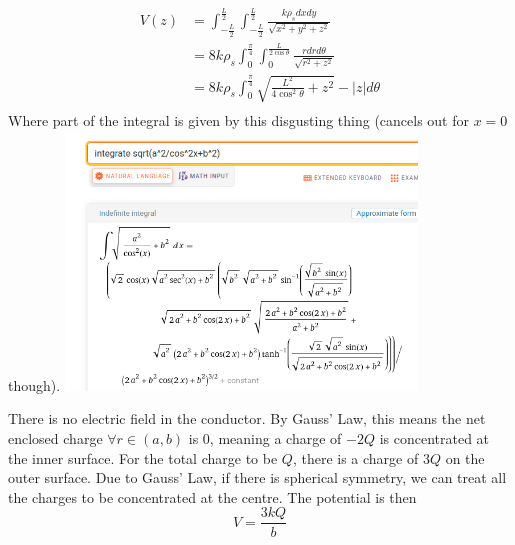 \documentclass[answers]{exam}
\begin{document}
\begin{questions}

\begin{solution}
	\begin{align*}
		V(z) &= \int_{-\frac{L}{2}}^{\frac{L}{2}} \int_{-\frac{L}{2}}^{\frac{L}{2}} \frac{k\rho_s dxdy}{\sqrt{x^2+y^2+z^2}} \\
		     &= 8k\rho_s \int_0^{\frac{\pi}{4}} \int_0^{\frac{L}{2\cos\theta}} \frac{rdrd\theta}{\sqrt{r^2+z^2}} \\
		     &= 8k\rho_s \int_0^{\frac{\pi}{4}} \sqrt{\frac{L^2}{4\cos^2\theta} + z^2} - |z| d\theta \\
	\end{align*}
	Where part of the integral is given by this disgusting thing (cancels out for $x=0$ though).
	\includegraphics[width=0.7\textwidth]{sol.png}
\end{solution}


\begin{solution}
	There is no electric field in the conductor. By Gauss' Law, this means the net enclosed charge $\forall r \in (a,b)$ is 0, meaning a charge of $-2Q$ is concentrated at the inner surface. For the total charge to be $Q$, there is a charge of $3Q$ on the outer surface. Due to Gauss' Law, if there is spherical symmetry, we can treat all the charges to be concentrated at the centre. The potential is then
	$$V = \frac{3kQ}{b}$$
\end{solution}


\end{questions}
\end{document}

